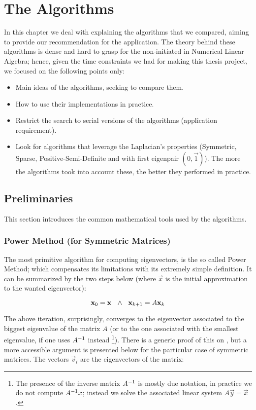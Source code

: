 \chapter{The Algorithms}

In this chapter we deal with explaining the algorithms that we
compared, aiming to provide our recommendation for the
application. The theory behind these algorithms is dense and hard to
grasp for the non-initiated in Numerical Linear Algebra; hence, given
the time constraints we had for making this thesis project, we focused
on the following points only:

\begin{itemize}
\item Main ideas of the algorithms, seeking to compare them.
\item How to use their implementations in practice.
\item Restrict the search to serial versions of the algorithms
  (application requirement).
\item Look for algorithms that leverage the \gls{Laplacian}'s properties
  (Symmetric, Sparse, Positive-Semi-Definite and with first eigenpair
  $(0,\vec{1})$). The more the algorithms took into account these, the
  better they performed in practice. 
\end{itemize}

\section{Preliminaries}

This section introduces the common mathematical tools used by the
algorithms.

\subsection{Power Method (for Symmetric Matrices)}

The most primitive algorithm for computing eigenvectors, is the so
called Power Method; which compensates its limitations with its
extremely simple definition. It can be summarized by the
two steps below (where $\vec{x}$ is the initial approximation to the
wanted eigenvector):

\begin{equation*}
    \mathbf{x}_0 = \mathbf{x} \,\,\,\,\land\,\,\,\,
    \mathbf{x}_{k+1} = A\mathbf{x}_k  
\end{equation*}
\joinbelow{1cm}

The above iteration, surprisingly, converges to the eigenvector
associated to the biggest eigenvalue of the matrix $A$ (or to the one
associated with the smallest eigenvalue, if one uses ${A}^{-1}$ instead
\footnote{The presence of the inverse matrix ${A}^{-1}$ is mostly due
  notation, in practice we do not compute ${A}^{-1}x$; instead we solve the
  associated linear system $A\vec{y} = \vec{x}$.}). There is a
generic proof of this on \cite{saad92}, but a more accessible argument
is presented below for the particular case of symmetric matrices. The vectors
$\vec{v}_i$ are the eigenvectors of the matrix:

